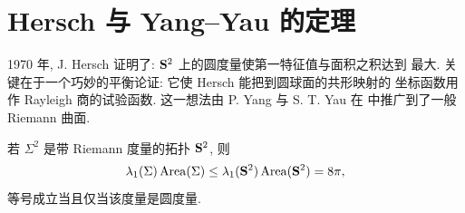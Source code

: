 \section{Hersch 与 Yang--Yau 的定理}
\label{sec:7.2}

1970 年, J. Hersch 证明了: $\mathbf{S}^2$ 上的圆度量使第一特征值与面积之积达到
最大. 关键在于一个巧妙的平衡论证: 它使 Hersch 能把到圆球面的共形映射的
坐标函数用作 Rayleigh 商的试验函数. 这一想法由 P. Yang 与 S. T. Yau 在
\cite{YgYa} 中推广到了一般 Riemann 曲面.

\begin{theorem}
\label{thm:7.6}
若 $\Sigma^2$ 是带 Riemann 度量的拓扑 $\mathbf{S}^2$, 则
\begin{equation}
\lambda_1(\Sigma)\operatorname{Area}(\Sigma)
\leq\lambda_1(\mathbf{S}^2)\operatorname{Area}(\mathbf{S}^2)=8\pi,
\label{eq:7.32}
\end{equation}
等号成立当且仅当该度量是圆度量.
\end{theorem}


